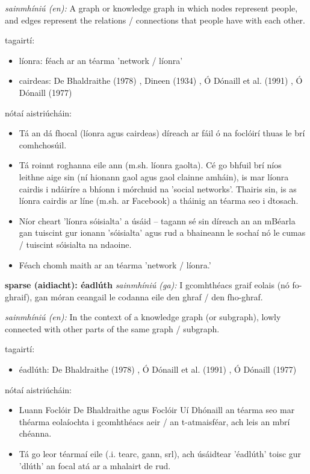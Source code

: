 \documentclass{article}
\begin{document}
\textit{sainmhíniú (en):} A graph or knowledge graph in which nodes represent people, and edges represent the relations / connections that people have with each other.

tagairtí:
\begin{itemize}
	\item líonra: féach ar an téarma 'network / líonra'
	\item cairdeas: De Bhaldraithe (1978) \cite{de-bhaldraithe}, Dineen (1934) \cite{dineen}, Ó Dónaill et al. (1991) \cite{focloir-beag}, Ó Dónaill (1977) \cite{odonaill}
\end{itemize}

nótaí aistriúcháin:
\begin{itemize}
	\item Tá an dá fhocal (líonra agus cairdeas) díreach ar fáil ó na foclóirí thuas le brí comhchosúil.
	\item Tá roinnt roghanna eile ann (m.sh. líonra gaolta). Cé go bhfuil brí níos leithne aige sin (ní hionann gaol agus gaol clainne amháin), is mar líonra cairdis i ndáiríre a bhíonn i mórchuid na 'social networks'. Thairis sin, is as líonra cairdis ar líne (m.sh. ar Facebook) a tháinig an téarma seo i dtosach.
	\item Níor cheart 'líonra sóisialta' a úsáid -- tagann sé sin díreach an an mBéarla gan tuiscint gur ionann 'sóisialta' agus rud a bhaineann le sochaí nó le cumas / tuiscint sóisialta na ndaoine.
	\item Féach chomh maith ar an téarma 'network / líonra.'
\end{itemize}


\textbf{sparse (aidiacht): éadlúth}
\textit{sainmhíniú (ga):} I gcomhthéacs graif eolais (nó fo-ghraif), gan móran ceangail le codanna eile den ghraf / den fho-ghraf.

\textit{sainmhíniú (en):} In the context of a knowledge graph (or subgraph), lowly connected with other parts of the same graph / subgraph.

tagairtí:
\begin{itemize}
	\item éadlúth: De Bhaldraithe (1978) \cite{de-bhaldraithe}, Ó Dónaill et al. (1991) \cite{focloir-beag}, Ó Dónaill (1977) \cite{odonaill}
\end{itemize}

nótaí aistriúcháin:
\begin{itemize}
	\item Luann Foclóir De Bhaldraithe agus Foclóir Uí Dhónaill an téarma seo mar théarma eolaíochta i gcomhthéacs aeir / an t-atmaisféar, ach leis an mbrí chéanna.
	\item Tá go leor téarmaí eile (.i. tearc, gann, srl), ach úsáidtear 'éadlúth' toisc gur 'dlúth' an focal atá ar a mhalairt de rud.
\end{itemize}
\end{document}
